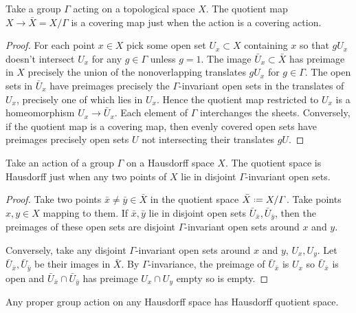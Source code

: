 \begin{theorem}\label{theorem:quotient.properly.discont}
Take a group \(\Gamma\) acting on a topological space \(X\).
The quotient map \(X \to \bar{X}= X/\Gamma\) is a covering map just when the action is a covering action.
\end{theorem}
\begin{proof}
For each point \(x \in X\) pick some open set \(U_x \subset X\) containing \(x\) so that \(gU_x\) doesn't intersect \(U_x\) for any \(g \in \Gamma\) unless \(g=1\).
The image \(\bar{U}_x \subset \bar{X}\) has preimage in \(X\) precisely the union of the nonoverlapping translates \(gU_x\) for \(g \in \Gamma\).
The open sets in \(\bar{U}_x\) have preimages precisely the \(\Gamma\)-invariant open sets in the translates of \(U_x\), precisely one of which lies in \(U_x\).
Hence the quotient map restricted to \(U_x\) is a homeomorphism \(U_x \to \bar{U}_x\).
Each element of \(\Gamma\) interchanges the sheets.
Conversely, if the quotient map is a covering map, then evenly covered open sets have preimages precisely open sets \(U\) not intersecting their translates \(gU\).
\end{proof}
\begin{theorem}\label{theorem:inv.open.sets}
Take an action of a group \(\Gamma\) on a Hausdorff space \(X\).
The quotient space is Hausdorff just when any two points of \(X\) lie in disjoint \(\Gamma\)-invariant open sets.
\end{theorem}
\begin{proof}
Take two points \(\bar{x}\ne \bar{y} \in \bar{X}\) in the quotient space \(\bar{X}\defeq X/\Gamma\).
Take points \(x, y \in X\) mapping to them.
If \(\bar{x}, \bar{y}\) lie in disjoint open sets \(\bar{U}_{\bar{x}}, \bar{U}_{\bar{y}}\), then the preimages of these open sets are disjoint \(\Gamma\)-invariant open sets around \(x\) and \(y\).

Conversely, take any disjoint \(\Gamma\)-invariant open sets around \(x\) and \(y\), \(U_x, U_y\).
Let \(\bar{U}_{\bar{x}}, \bar{U}_{\bar{y}}\) be their images in \(\bar{X}\).
By \(\Gamma\)-invariance, the preimage of \(\bar{U}_{\bar{x}}\) is \(U_x\) so \(\bar{U}_{\bar{x}}\) is open and \(\bar{U}_{\bar{x}} \cap \bar{U}_{\bar{y}}\) has preimage \(U_x \cap U_y\) empty so is empty.
\end{proof}
\begin{theorem}\label{theorem:proper.action}
Any proper group action on any Hausdorff space has Hausdorff quotient space.
\end{theorem}
